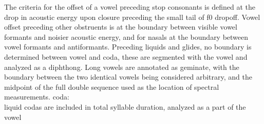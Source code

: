\documentclass[11pt]{article}
\begin{document}
The criteria for the offset of a vowel preceding stop consonants is defined at the drop in acoustic energy upon closure preceding the small tail of f0 dropoff. Vowel offset preceding other obstruents is at the boundary between visible vowel formants and noisier acoustic energy, and for nasals at the boundary between vowel formants and antiformants. 
Preceding liquids and glides, no boundary is determined between vowel and coda, these are segmented with the vowel and analyzed as a diphthong. 
Long vowels are annotated as geminate, with the boundary between the two identical vowels being considered arbitrary, and the midpoint of the full double sequence used as the location of spectral measurements. 
coda: \\
liquid codas are included in total syllable duration, analyzed as a part of the vowel 
\end{document}
